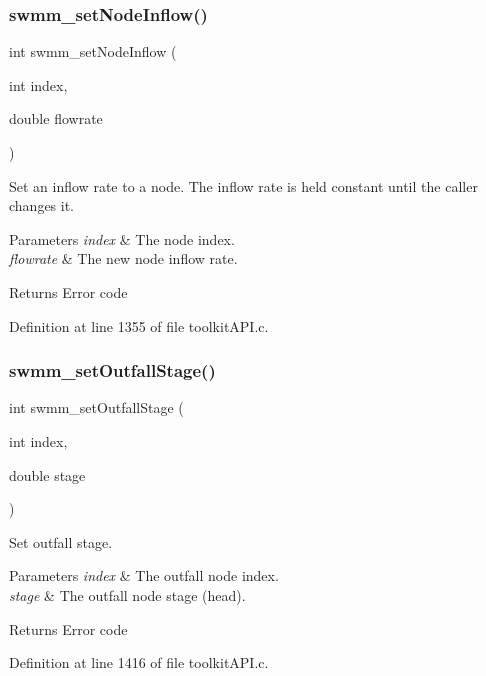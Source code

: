 \subsubsection{\texorpdfstring{swmm\+\_\+set\+Node\+Inflow()}{swmm\_setNodeInflow()}}
{\footnotesize\ttfamily int swmm\+\_\+set\+Node\+Inflow (\begin{DoxyParamCaption}\item[{int}]{index,  }\item[{double}]{flowrate }\end{DoxyParamCaption})}



Set an inflow rate to a node. The inflow rate is held constant until the caller changes it. 


\begin{DoxyParams}{Parameters}
{\em index} & The node index. \\
\hline
{\em flowrate} & The new node inflow rate. \\
\hline
\end{DoxyParams}
\begin{DoxyReturn}{Returns}
Error code 
\end{DoxyReturn}


Definition at line 1355 of file toolkit\+A\+P\+I.\+c.

\mbox{\label{group__tkfuncs_ga80d902400625073d8ff2c392365fde9b}} 
\subsubsection{\texorpdfstring{swmm\+\_\+set\+Outfall\+Stage()}{swmm\_setOutfallStage()}}
{\footnotesize\ttfamily int swmm\+\_\+set\+Outfall\+Stage (\begin{DoxyParamCaption}\item[{int}]{index,  }\item[{double}]{stage }\end{DoxyParamCaption})}



Set outfall stage. 


\begin{DoxyParams}{Parameters}
{\em index} & The outfall node index. \\
\hline
{\em stage} & The outfall node stage (head). \\
\hline
\end{DoxyParams}
\begin{DoxyReturn}{Returns}
Error code 
\end{DoxyReturn}


Definition at line 1416 of file toolkit\+A\+P\+I.\+c.

